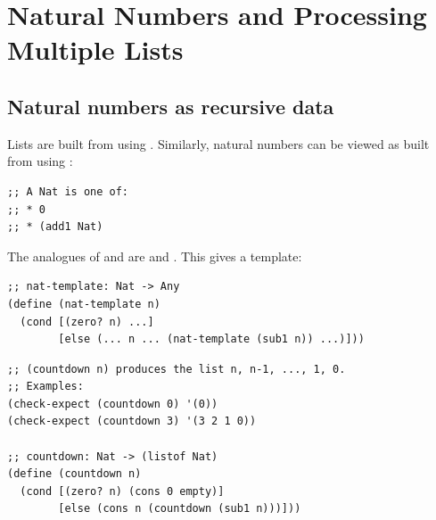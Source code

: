 \chapter{Natural Numbers and Processing Multiple Lists}

\section{Natural numbers as recursive data}

Lists are built from  using . Similarly, natural numbers
can be viewed as built from  using :

\begin{lstlisting}[style=racket]
;; A Nat is one of:
;; * 0
;; * (add1 Nat)
\end{lstlisting}

\begin{center}
\end{center}

The analogues of  and  are  and
. This gives a template:

\begin{lstlisting}[style=racket]
;; nat-template: Nat -> Any
(define (nat-template n)
  (cond [(zero? n) ...]
        [else (... n ... (nat-template (sub1 n)) ...)]))
\end{lstlisting}

\begin{example}[Countdown]
\begin{lstlisting}[style=racket]
;; (countdown n) produces the list n, n-1, ..., 1, 0.
;; Examples:
(check-expect (countdown 0) '(0))
(check-expect (countdown 3) '(3 2 1 0))

;; countdown: Nat -> (listof Nat)
(define (countdown n)
  (cond [(zero? n) (cons 0 empty)]
        [else (cons n (countdown (sub1 n)))]))
\end{lstlisting}
\end{example}

